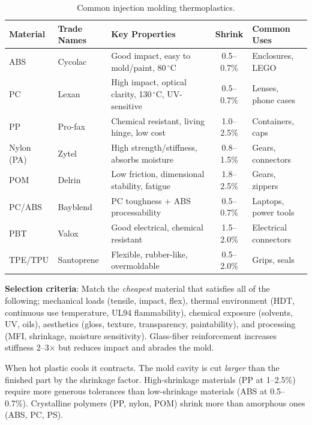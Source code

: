 \documentclass[11pt,letterpaper,twoside,openany]{book}
\newcommand{\degC}{\ensuremath{{}^{\circ}\text{C}}}
\begin{document}
\begin{table}[htbp]
\centering\small
\begin{tabularx}{\textwidth}{l l X c l}
  \toprule
  \textbf{Material} & \textbf{Trade Names} & \textbf{Key Properties} & \textbf{Shrink} & \textbf{Common Uses} \\
  \midrule
  ABS & Cycolac & Good impact, easy to mold/paint, 80\,\degC & 0.5--0.7\% & Enclosures, LEGO \\
  PC & Lexan & High impact, optical clarity, 130\,\degC, UV-sensitive & 0.5--0.7\% & Lenses, phone cases \\
  PP & Pro-fax & Chemical resistant, living hinge\index{living hinge}, low cost & 1.0--2.5\% & Containers, caps \\
  Nylon (PA) & Zytel & High strength/stiffness, absorbs moisture & 0.8--1.5\% & Gears, connectors \\
  POM & Delrin & Low friction, dimensional stability, fatigue & 1.8--2.5\% & Gears, zippers \\
  PC/ABS & Bayblend & PC toughness + ABS processability & 0.5--0.7\% & Laptops, power tools \\
  PBT & Valox & Good electrical, chemical resistant & 1.5--2.0\% & Electrical connectors \\
  TPE/TPU & Santoprene & Flexible, rubber-like, overmoldable & 0.5--2.0\% & Grips, seals \\
  \bottomrule
\end{tabularx}
\caption{Common injection molding thermoplastics.}
\end{table}

\textbf{Selection criteria}: Match the \emph{cheapest} material that satisfies all of the following; mechanical loads (tensile, impact, flex), thermal environment (HDT, continuous use temperature, UL94 flammability), chemical exposure (solvents, UV, oils), aesthetics (gloss, texture, transparency, paintability), and processing (MFI, shrinkage, moisture sensitivity). Glass-fiber reinforcement increases stiffness 2--3$\times$ but reduces impact and abrades the mold.

\begin{tipbox}
When hot plastic cools it contracts. The mold cavity is cut \emph{larger} than the finished part by the shrinkage factor. High-shrinkage materials (PP at 1--2.5\%) require more generous tolerances than low-shrinkage materials (ABS at 0.5--0.7\%). Crystalline polymers (PP, nylon, POM) shrink more than amorphous ones (ABS, PC, PS).
\end{tipbox}
\end{document}
